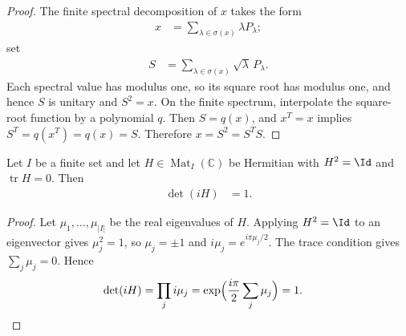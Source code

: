 \begin{proof}\leanok
    The finite spectral decomposition of $x$ takes the form
    \begin{align}
        x & = \sum_{\lambda\in\sigma(x)} \lambda P_\lambda;
    \end{align}
    set
    \begin{align}
        S & = \sum_{\lambda\in\sigma(x)} \sqrt{\lambda}\,P_\lambda.
    \end{align}
    Each spectral value has modulus one, so its square root has modulus one,
    and hence $S$ is unitary and $S^2=x$. On the finite spectrum, interpolate
    the square-root function by a polynomial $q$. Then $S=q(x)$, and
    $x^T=x$ implies $S^T=q(x^T)=q(x)=S$. Therefore $x=S^2=S^T S$.
\end{proof}

\begin{lemma}
    \label{lem:mpu_det_i_hermitian_involution}
    \leanok
    Let $I$ be a finite set and let $H\in\operatorname{Mat}_I(\mathbb C)$ be
    Hermitian with $H^2=\Id$ and $\operatorname{tr}H=0$. Then
    \begin{align}
        \det(iH) & =1.
    \end{align}
\end{lemma}

\begin{proof}\leanok
    Let $\mu_1,\dots,\mu_{|I|}$ be the real eigenvalues of $H$. Applying
    $H^2=\Id$ to an eigenvector gives $\mu_j^2=1$, so $\mu_j=\pm1$ and
    $i\mu_j=e^{i\pi\mu_j/2}$. The trace condition gives $\sum_j\mu_j=0$.
    Hence
    \begin{align}
        \det(iH)
         & =\prod_j i\mu_j
        =\exp\Bigl(\frac{i\pi}{2}\sum_j\mu_j\Bigr)
        =1.
    \end{align}
\end{proof}

